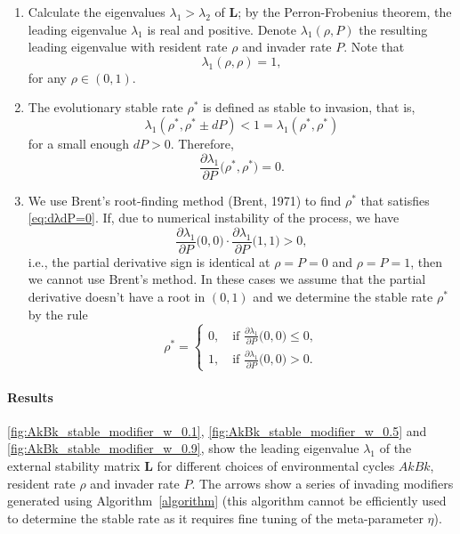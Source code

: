 \documentclass[11pt, oneside]{article}   	%
\let\vec\mathbf
\begin{document}
\begin{enumerate}
\item Calculate the eigenvalues $\lambda_1 > \lambda_2$ of $\vec{L}$; by the Perron-Frobenius theorem, the leading eigenvalue $\lambda_1$ is real and positive. Denote $\lambda_1(\rho, P)$ the resulting leading eigenvalue with resident rate $\rho$ and invader rate $P$. Note that 
\begin{equation}
\lambda_1(\rho, \rho) = 1,
\end{equation}
for any $\rho \in (0,1)$.

\item The evolutionary stable rate $\rho^*$ is defined as stable to invasion, that is, 
\begin{equation}
\lambda_1(\rho^*,\rho^* \pm dP) < 1 = \lambda_1(\rho^*,\rho^*)
\end{equation}
for a small enough $dP>0$.
Therefore, 
\begin{equation}
\frac{\partial \lambda_1}{\partial P}\big(\rho^*,\rho^*\big) = 0. 
\label{eq:dλdP=0} \end{equation}

\item We use Brent's root-finding method (Brent, 1971) to find $\rho^*$ that satisfies \autoref{eq:dλdP=0}. If, due to numerical instability of the process, we have
\begin{equation}
\frac{\partial \lambda_1}{\partial P}\big(0,0\big) \cdot \frac{\partial \lambda_1}{\partial P}\big(1,1) > 0,
\end{equation}
i.e., the partial derivative sign is identical at $\rho=P=0$ and $\rho=P=1$, then we cannot use Brent's method. In these cases we assume that the partial derivative doesn't have a root in $(0,1)$ and we determine the stable rate $\rho^*$ by the rule
\begin{equation}
\rho^* = \begin{cases}
0, \quad \text{if } \frac{\partial \lambda_1}{\partial P}\big(0,0\big) \le 0, \\
1, \quad \text{if } \frac{\partial \lambda_1}{\partial P}\big(0,0\big) > 0.
\end{cases}
\end{equation}

\end{enumerate}

\paragraph{Results}
\autoref{fig:AkBk_stable_modifier_w_0.1}, \autoref{fig:AkBk_stable_modifier_w_0.5} and \autoref{fig:AkBk_stable_modifier_w_0.9}, show the leading eigenvalue $\lambda_1$ of the external stability matrix $\vec{L}$ for different choices of environmental cycles $AkBk$, resident rate $\rho$ and invader rate $P$. The arrows show a series of invading modifiers generated using Algorithm~\autoref{algorithm} (this algorithm cannot be efficiently used to determine the stable rate as it requires fine tuning of the meta-parameter $\eta$).
\end{document}
